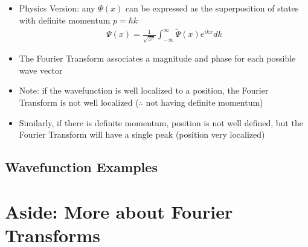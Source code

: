\documentclass[a4paper,12pt]{article}
\begin{document}
\begin{itemize}
  \item Physics Version: any $\Psi(x)$ can be expressed as the superposition of states with definite momentum $p = \hbar k$
  \begin{align}
    \Psi(x) = \frac{1}{\sqrt{2\pi}} \int^{\infty}_{-\infty}\widetilde{\Psi}(x) e^{ikx} dk
  \end{align}
  \item The Fourier Transform associates a magnitude and phase for each possible wave vector
  \item Note: if the wavefunction is well localized to a position, the Fourier Transform is not well localized ($\therefore$ not having definite momentum)
  \item Similarly, if there is definite momentum, position is not well defined, but the Fourier Transform will have a single peak (position very localized)

\end{itemize}



\subsection{Wavefunction Examples}

\section{Aside: More about Fourier Transforms}
\end{document}
